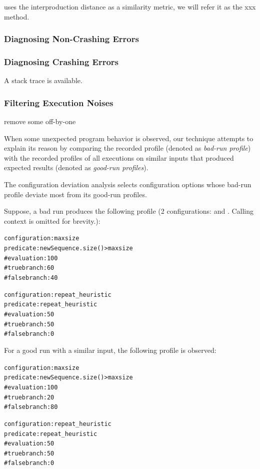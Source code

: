 \ourtool uses the interproduction distance as a similarity metric, we will
refer it as the xxx method.

\subsubsection{Diagnosing Non-Crashing Errors}

\subsubsection{Diagnosing Crashing Errors}

A stack trace is available.

\subsubsection{Filtering Execution Noises}

remove some off-by-one


When some unexpected program behavior is observed, our technique
attempts to explain its reason by comparing the recorded profile (denoted
as \textit{bad-run profile}) with the recorded profiles of all
executions on similar inputs that produced expected results (denoted as \textit{good-run profiles}).

The configuration deviation analysis selects configuration
options whose bad-run profile deviate most from its good-run profiles.

Suppose, a bad run produces the following profile (2 configurations: 
and . Calling context is omitted for brevity.):

\begin{CodeOut}
\begin{alltt}
configuration: maxsize 
predicate: newSequence.size() > maxsize
    \# evaluation: 100
    \# true branch: 60
    \# false branch: 40

configuration: repeat_heuristic
predicate: repeat_heuristic
    \# evaluation: 50
    \# true branch: 50
    \# false branch: 0
\end{alltt}
\end{CodeOut}

For a good run with a similar input, the following profile is observed:

\begin{CodeOut}
\begin{alltt}
configuration: maxsize 
predicate: newSequence.size() > maxsize
    \# evaluation: 100
    \# true branch: 20
    \# false branch: 80

configuration: repeat\_heuristic
predicate: repeat\_heuristic
    \# evaluation: 50
    \# true branch: 50
    \# false branch: 0
\end{alltt}
\end{CodeOut}


